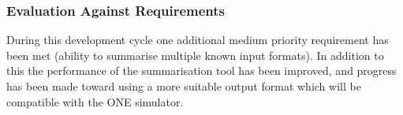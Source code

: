     \subsubsection{Evaluation Against Requirements}
    During this development cycle one additional medium priority requirement has been met (ability to summarise multiple known input formats). In addition to this the performance of the summarisation tool has been improved, and progress has been made toward using a more suitable output format which will be compatible with the ONE simulator.
    


